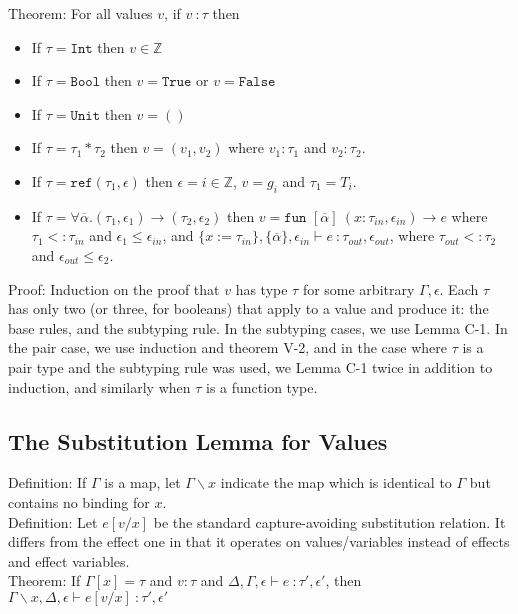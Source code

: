 \documentclass{article}
\newcommand{\Z}{\mathbb{Z}}
\begin{document}
\noindent Theorem: For all values $v$, if $v\ \colon \tau$ then
\begin{itemize}
	\item If $\tau = \texttt{Int}$ then $v \in \Z$
	\item If $\tau = \texttt{Bool}$ then $v = \texttt{True}$ or $v = \texttt{False}$
	\item If $\tau = \texttt{Unit}$ then $v = ()$
	\item If $\tau = \tau_1 * \tau_2$ then $v = (v_1, v_2)$ where $v_1 : \tau_1$ and $v_2 : \tau_2$.
	\item If $\tau = \texttt{ref} (\tau_1, \epsilon)$ then $\epsilon = i \in \Z$, $v = g_i$ and $\tau_1 = T_i$.
	\item If $\tau = \forall \overline \alpha.(\tau_1, \epsilon_1) \rightarrow (\tau_2, \epsilon_2)$ then $v = \texttt{fun } [\overline \alpha]\ (x : \tau_{in}, \epsilon_{in}) \rightarrow e$ where $\tau_1 <: \tau_{in}$ and $\epsilon_1 \leq \epsilon_{in}$, and $\{x := \tau_{in}\}, \{\overline\alpha\}, \epsilon_{in} \vdash e\ \colon \tau_{out}, \epsilon_{out}$, where $\tau_{out} <: \tau_2$ and $\epsilon_{out} \leq \epsilon_2$. 
\end{itemize}

\noindent Proof: Induction on the proof that $v$ has type $\tau$ for some arbitrary $\Gamma, \epsilon$. Each $\tau$ has only two (or three, for booleans) that apply to a value and produce it: the base rules, and the subtyping rule. In the subtyping cases, we use Lemma C-1. In the pair case, we use induction and theorem V-2, and in the case where $\tau$ is a pair type and the subtyping rule was used, we Lemma C-1 twice in addition to induction, and similarly when $\tau$ is a function type.

\subsection*{The Substitution Lemma for Values}

\noindent Definition: If $\Gamma$ is a map, let $\Gamma \backslash x$ indicate the map which is identical to $\Gamma$ but contains no binding for $x$.
\\

\noindent Definition: Let $e[v/x]$ be the standard capture-avoiding substitution relation. It differs from the effect one in that it operates on values/variables instead of effects and effect variables.
\\

\noindent Theorem: If $\Gamma[x] = \tau$ and $v : \tau$ and $\Delta, \Gamma, \epsilon \vdash e\ \colon \tau', \epsilon'$, then $\Gamma\backslash x, \Delta, \epsilon \vdash e[v/x]\ \colon \tau', \epsilon'$
\end{document}
